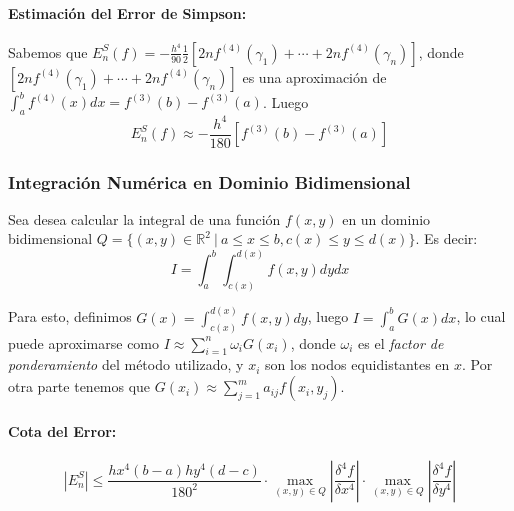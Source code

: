 \hypertarget{estimaciuxf3n-del-error-de-simpson}{%
\paragraph{Estimación del Error de
Simpson:}\label{estimaciuxf3n-del-error-de-simpson}}

Sabemos que
\(E_n^S(f) = - \frac{h^4}{90} \frac{1}{2} [2nf^{(4)}(\gamma_1) + \cdots + 2nf^{(4)}(\gamma_n)]\),
donde \([2nf^{(4)}(\gamma_1) + \cdots + 2nf^{(4)}(\gamma_n)]\) es una
aproximación de \(\int_a^b f^{(4)}(x) dx = f^{(3)}(b) - f^{(3)}(a)\).
Luego \[ E_n^S(f) \approx
-\frac{h^4}{180}[f^{(3)}(b) - f^{(3)}(a)]\]

\hypertarget{integraciuxf3n-numuxe9rica-en-dominio-bidimensional}{%
\subsubsection{Integración Numérica en Dominio
Bidimensional}\label{integraciuxf3n-numuxe9rica-en-dominio-bidimensional}}

Sea desea calcular la integral de una función \(f(x, y)\) en un dominio
bidimensional
\(Q = \{(x, y)\in \ensuremath{\mathbb{R}}^2\  |\  a \leq x \leq b, c(x) \leq y \leq d(x)\}\).
Es decir: \[
I = \int_a^b \int_{c(x)}^{d(x)} f(x, y) dy dx
\]

Para esto, definimos \(G(x) = \int_{c(x)}^{d(x)} f(x, y) dy\), luego
\(I = \int_a^b G(x) dx\), lo cual puede aproximarse como
\(I \approx \sum_{i=1}^n \omega_i G(x_i)\), donde \(\omega_i\) es el
\emph{factor de ponderamiento} del método utilizado, y \(x_i\) son los
nodos equidistantes en \(x\). Por otra parte tenemos que
\(G(x_i) \approx \sum_{j=1}^m a_{ij} f(x_i, y_j)\).

\hypertarget{cota-del-error}{%
\paragraph{Cota del Error:}\label{cota-del-error}}

\[ 
|E_n^S| \leq \frac{h x^4 (b-a) hy^4(d-c)}{180^2} 
\cdot \max_{(x,y)\in Q} \left| \frac{\delta^4f}{\delta x^4} \right| 
\cdot \max_{(x,y)\in Q} \left| \frac{\delta^4f}{\delta y^4} \right| 
\]
